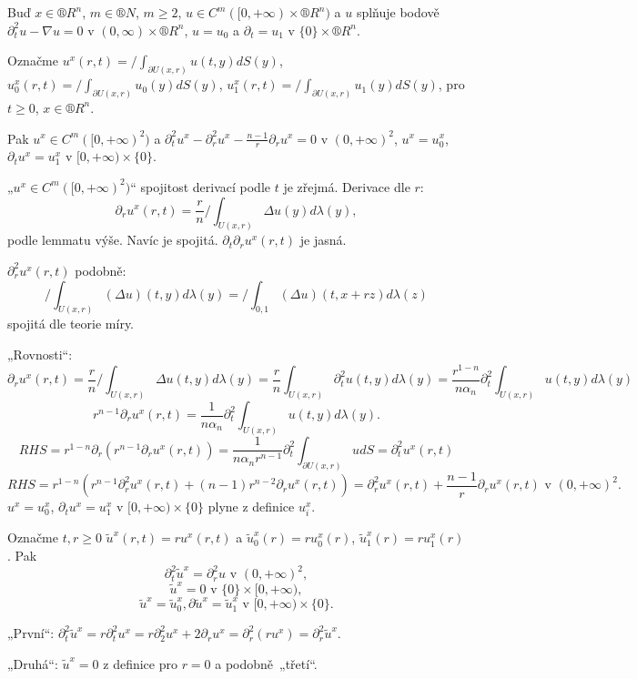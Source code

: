 \documentclass[12pt]{article}					%
\begin{document}
\begin{lemma}
	Buď $x \in ®R^n$, $m \in ®N$, $m ≥ 2$, $u \in C^m([0, +∞) \times ®R^n)$ a $u$ splňuje bodově $\partial_t^2 u - \nabla u = 0$ v $(0, ∞) \times ®R^n$, $u = u_0$ a $\partial_t = u_1$ v $\{0\} \times ®R^n$.

	Označme $u^x(r, t) = /\!\!\!\!\!\int_{\partial U(x, r)} u(t, y) dS(y)$, $u_0^x(r, t) = /\!\!\!\!\!\int_{\partial U(x, r)} u_0(y) dS(y)$, $u_1^x(r, t) = /\!\!\!\!\!\int_{\partial U(x, r)} u_1(y) dS(y)$, pro $t ≥ 0$, $x \in ®R^n$.

	Pak $u^x \in C^m([0, +∞)^2)$ a $\partial_t^2 u^x - \partial_r^2 u^x - \frac{n-1}{r} \partial_r u^x = 0$ v $(0, +∞)^2$, $u^x = u_0^x$, $\partial_t u^x = u_1^x$ v $[0, +∞)\times\{0\}$.

	\begin{dukazin}
		„$u^x \in C^m([0, +∞)^2)$“ spojitost derivací podle $t$ je zřejmá. Derivace dle $r$:
		$$ \partial_r u^x(r, t) = \frac{r}{n} /\!\!\!\!\!\int_{U(x, r)} \Delta u(y) d\lambda(y), $$
		podle lemmatu výše. Navíc je spojitá. $\partial_t\partial_r u^x(r, t)$ je jasná.

		$\partial_r^2 u^x(r, t)$ podobně:
		$$ /\!\!\!\!\!\int_{U(x, r)} (\Delta u)(t, y) d\lambda(y) = /\!\!\!\!\!\int_{0, 1}(\Delta u)(t, x + rz) d\lambda(z) $$
		spojitá dle teorie míry.

		„Rovnosti“:
		$$ \partial_r u^x(r, t) = \frac{r}{n} /\!\!\!\!\!\int_{U(x, r)} \Delta u(t, y) d\lambda(y) = \frac{r}{n} \int_{U(x, r)} \partial_t^2 u(t, y) d\lambda(y) = \frac{r^{1 - n}}{n \alpha_n} \partial_t^2 \int_{U(x, r)} u(t, y) d\lambda(y) $$
		$$ r^{n-1} \partial_r u^x(r, t) = \frac{1}{n\alpha_n} \partial_t^2 \int_{U(x, r)} u(t, y) d\lambda(y). $$
		$$ RHS = r^{1 - n} \partial_r(r^{n-1} \partial_r u^x(r, t)) = \frac{1}{n\alpha_n r^{n-1}} \partial_t^2 \int_{\partial U(x, r)} u dS = \partial_t^2 u^x(r, t) $$
		$$ RHS = r^{1 - n}(r^{n-1} \partial_r^2 u^x(r, t) + (n-1)r^{n-2} \partial_r u^x(r, t)) = \partial_r^2 u^x(r, t) + \frac{n-1}{r} \partial_r u^x(r, t) \text{ v } (0, +∞)^2. $$
		$u^x = u_0^x$, $\partial_t u^x = u_1^x$ v $[0, +∞) \times \{0\}$ plyne z definice $u_i^x$.
	\end{dukazin}
\end{lemma}

\begin{lemma}[Doplnění pro $n=3$]
	Označme $t, r ≥ 0$ $\tilde u^x(r, t) = r u^x(r, t)$ a $\tilde u_0^x(r) = r u_0^x(r)$, $\tilde u_1^x(r) = r u_1^x(r)$. Pak
	$$ \partial_t^2 \tilde u^x = \partial_r^2 u \text{ v } (0, +∞)^2, $$
	$$ \tilde u^x = 0 \text{ v } \{0\} \times [0, +∞), $$
	$$ \tilde u^x = \tilde u_0^x, \partial \tilde u^x = \tilde u_1^x \text{ v } [0, +∞) \times \{0\}. $$

	\begin{dukazin}
		„První“: $\partial_t^2 \tilde u^x = r \partial_t^2 u^x = r\partial_2^2 u^x + 2\partial_r u^x = \partial_r^2 (r u^x) = \partial_r^2 \tilde u^x$.

		„Druhá“: $\tilde u^x = 0$ z definice pro $r = 0$ a podobně „třetí“.
	\end{dukazin}
\end{lemma}
\end{document}
